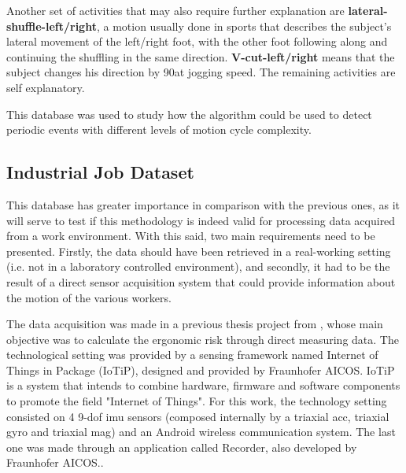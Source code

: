 Another set of activities that may also require further explanation are \textbf{lateral-shuffle-left/right}, a motion usually done in sports that describes the subject's lateral movement of the left/right foot, with the other foot following along and continuing the shuffling in the same direction. \textbf{V-cut-left/right} means that the subject changes his direction by 90\degree at jogging speed. The remaining activities are self explanatory.

This database was used to study how the algorithm could be used to detect periodic events with different levels of motion cycle complexity. 

\subsection{Industrial Job Dataset}

This database has greater importance in comparison with the previous ones, as it will serve to test if this methodology is indeed valid for processing data acquired from a work environment. With this said, two main requirements need to be presented. Firstly, the data should have been retrieved in a real-working setting (i.e. not in a laboratory controlled environment), and secondly, it had to be the result of a direct sensor acquisition system that could provide information about the motion of the various workers.

The data acquisition was made in a previous thesis project from \cite{santos2019}, whose main objective was to calculate the ergonomic risk through  direct measuring data. 
The technological setting was provided by a sensing framework named Internet of Things in Package (IoTiP), designed and provided by Fraunhofer AICOS. IoTiP is a system that intends to combine hardware, firmware and software components to promote the field "Internet of Things"\cite{FraunhoferAICOS}. For this work, the technology setting consisted on 4 9-\gls{dof} \gls{imu} sensors (composed internally by a triaxial \gls{acc}, triaxial \gls{gyro} and triaxial \gls{mag}) and an Android wireless communication system. The last one was made through an application called Recorder, also developed by Fraunhofer AICOS.\cite{santos2019}.


